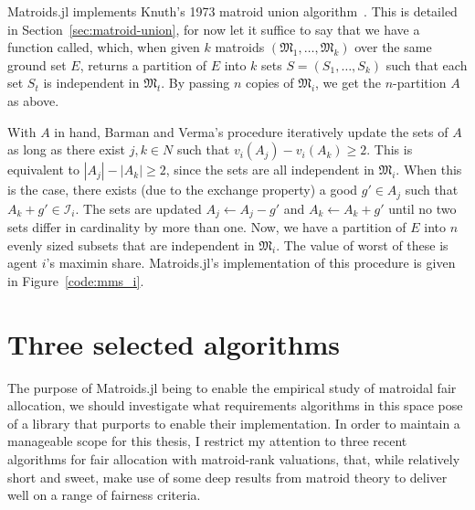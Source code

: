 Matroids.jl implements Knuth's 1973 matroid union algorithm~\cite{knuth1973matroidpartitioning}. This is detailed in Section~\ref{sec:matroid-union}, for now let it suffice to say that we have a function called\linebreak{}, which, when given $k$ matroids $(\mathfrak{M}_1,\dots,\mathfrak{M}_k)$ over the same ground set $E$, returns a partition of $E$ into $k$ sets $S = (S_1, \dots, S_k)$ such that each set $S_t$ is independent in $\mathfrak{M}_t$. By passing $n$ copies of $\mathfrak{M}_i$, we get the $n$-partition $A$ as above.

With $A$ in hand, Barman and Verma's procedure iteratively update the sets of $A$ as long as there exist $j, k \in N$ such that $v_i(A_j) - v_i(A_k) \geq 2$. This is equivalent to $|A_j| - |A_k| \geq 2$, since the sets are all independent in $\mathfrak{M}_i$. When this is the case, there exists (due to the exchange property) a good $g'\in A_j$ such that $A_k + g' \in \mathcal{I}_i$. The sets are updated $A_j \leftarrow A_j - g'$ and $A_k \leftarrow A_k + g'$ until no two sets differ in cardinality by more than one. Now, we have a partition of $E$ into $n$ evenly sized subsets that are independent in $\mathfrak{M}_i$. The value of worst of these is agent $i$'s maximin share. Matroids.jl's implementation of this procedure is given in Figure~\ref{code:mms_i}.




\section{Three selected algorithms}
The purpose of Matroids.jl being to enable the empirical study of matroidal fair allocation, we should investigate what requirements algorithms in this space pose of a library that purports to enable their implementation. In order to maintain a manageable scope for this thesis, I restrict my attention to three recent algorithms for fair allocation with matroid-rank valuations, that, while relatively short and sweet, make use of some deep results from matroid theory to deliver well on a range of fairness criteria.

